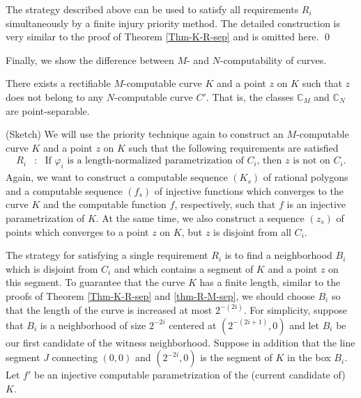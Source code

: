 \documentclass{LMCS}
\theoremstyle{plain}
\def\IC{\mathbb{C}}
\begin{document}
The strategy described above can be used to satisfy all requirements $R_i$ simultaneously by a finite injury priority method. The detailed construction is very similar to the proof of Theorem \ref{Thm-K-R-sep} and is omitted here.
\qed

Finally, we show the difference between $M$- and $N$-computability of curves.

\begin{thm}\label{thm-M-N-sep}
There exists a rectifiable  $M$-computable curve $K$ and a point $z$ on $K$ such that $z$ does not belong to any $N$-computable curve $C'$. That is, the classes $\IC_M$ and $\IC_N$ are point-separable.
\end{thm}
\proof (Sketch) We will use the priority technique again to construct an $M$-computable curve $K$ and a point $z$ on $K$ such that the following requirements are satisfied
\begin{eqnarray*}
  R_i &:& \mbox{If $\varphi_i$ is a length-normalized parametrization of $C_i$, then $z$ is not on $C_i$.}
\end{eqnarray*}
Again, we want to construct a computable sequence $(K_s)$ of rational polygons and a computable sequence $(f_s)$ of injective functions which converges to the curve $K$ and the computable function $f$, respectively, such that $f$ is an injective parametrization of $K$. At the same time, we also construct a sequence $(z_s)$ of points which converges to a point $z$ on $K$, but $z$ is disjoint from all $C_i$.

The strategy for satisfying a single requirement $R_i$ is to find a neighborhood $B_i$ which is disjoint from $C_i$ and which contains a segment of $K$ and a point $z$ on this segment. To guarantee that the curve $K$ has a finite length, similar to the proofs of Theorem \ref{Thm-K-R-sep} and \ref{thm-R-M-sep}, we should choose $B_i$ so that the length of the curve is increased at most  $2^{-(2i)}$. For simplicity, suppose that $B_i$ is a neighborhood of size $2^{-2i}$ centered at $(2^{-(2i+1)},0)$ and let $B_i$ be our first candidate of the witness neighborhood. Suppose in addition that the line segment $J$ connecting $(0,0)$ and $(2^{-2i}, 0)$ is the segment of $K$ in the box $B_i$. Let $f'$ be an injective computable parametrization of the (current candidate of) $K$.
\end{document}
